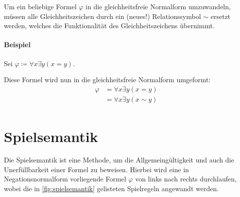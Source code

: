             Um ein beliebige Formel $ \varphi $ in die gleichheitsfreie Normalform umzuwandeln, müssen alle Gleichheitszeichen durch ein (neues!) Relationssymbol $ \sim $ ersetzt werden, welches die Funktionalität des Gleichheitszeichens übernimmt.

            \paragraph{Beispiel}
                Sei $ \varphi \coloneqq \forall x \exists y (x = y) $.

                Diese Formel wird nun in die gleichheitsfreie Normalform umgeformt:
                \begin{align*}
                    \varphi &= \forall x \exists y (x = y) \tag{Substitution} \\
                            &= \forall x \exists y (x \sim y) \tag{Gleichheitsfreie Normalform} \\
                \end{align*}

    \section{Spielsemantik}
        Die Spielsemantik ist eine Methode, um die Allgemeingültigkeit und auch die Unerfüllbarkeit einer Formel zu beweisen. Hierbei wird eine in Negationsnormalform vorliegende Formel $ \varphi $ von links nach rechts durchlaufen, wobei die in \ref{fig:spielsemantik} gelisteten Spielregeln angewandt werden.

